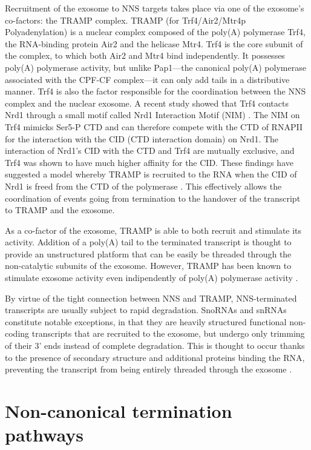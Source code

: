 Recruitment of the exosome to NNS targets takes place via one of the exosome’s co-factors: the TRAMP complex. 
TRAMP (for Trf4/Air2/Mtr4p Polyadenylation) is a nuclear complex composed of the poly(A) polymerase Trf4, the RNA-binding protein Air2 and the helicase Mtr4. 
Trf4 is the core subunit of the complex, to which both Air2 and Mtr4 bind independently. 
It possesses poly(A) polymerase activity, but unlike Pap1---the canonical poly(A) polymerase associated with the CPF-CF complex---it can only add tails in a distributive manner. 
Trf4 is also the factor responsible for the coordination between the NNS complex and the nuclear exosome. 
A recent study showed that Trf4 contacts Nrd1 through a small motif called Nrd1 Interaction Motif (NIM) . 
The NIM on Trf4 mimicks Ser5-P CTD and can therefore compete with the CTD of RNAPII for the interaction with the CID (CTD interaction domain) on Nrd1. 
The interaction of Nrd1’s CID with the CTD and Trf4 are mutually exclusive, and Trf4 was shown to have much higher affinity for the CID. 
These findings have suggested a model whereby TRAMP is recruited to the RNA when the CID of Nrd1 is freed from the CTD of the polymerase \cite{tudek:2014:molecular}. 
This effectively allows the coordination of events going from termination to the handover of the transcript to TRAMP and the exosome.

As a co-factor of the exosome, TRAMP is able to both recruit and stimulate its activity. 
Addition of a poly(A) tail to the terminated transcript is thought to provide an unstructured platform that can be easily be threaded through the non-catalytic subunits of the exosome. 
However, TRAMP has been known to stimulate exosome activity even indipendently of poly(A) polymerase activity \cite{tudek:2014:molecular}. 

By virtue of the tight connection between NNS and TRAMP, NNS-terminated transcripts are usually subject to rapid degradation. SnoRNAs and snRNAs constitute notable exceptions, in that they are heavily structured functional non-coding transcripts that are recruited to the exosome, but undergo only trimming of their 3’ ends instead of complete degradation. This is thought to occur thanks to the presence of secondary structure and additional proteins binding the RNA, preventing the transcript from being entirely threaded through the exosome \cite{mitchel:1997:exosome}.


\section{Non-canonical termination pathways}

